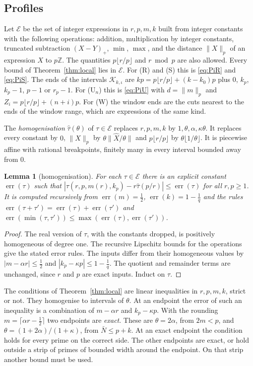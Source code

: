 \documentclass[11pt]{amsart}
\newtheorem{lemma}[theorem]{Lemma}
\theoremstyle{definition}
\theoremstyle{remark}
\numberwithin{equation}{section}
\newcommand{\Z}{\mathbb Z}
\newcommand{\err}{\operatorname{err}}
\begin{document}
\subsection{Profiles}\label{ssec:profiles}
Let $\mathcal E$ be the set of integer expressions in $r,p,m,k$ built from integer constants with the following
operations: addition, multiplication by integer constants, truncated subtraction $(X-Y)_+$, $\min$, $\max$, and the
distance $\|X\|_p$ of an expression $X$ to $p\Z$. The quantities $p\lfloor r/p\rfloor$ and $r\bmod p$ are also allowed.
Every bound of Theorem~\ref{thm:local} lies in $\mathcal E$. For (R) and (S) this is \eqref{eq:PiR} and \eqref{eq:PiS}.
The ends of the intervals $\mathcal K_{k,\iota}$ are $kp=p\lfloor r/p\rfloor+(k-k_0)p$ plus $0$, $k_p$, $k_p-1$, $p-1$ or
$r_p-1$. For (U$_n$) this is \eqref{eq:PiU} with $d=\|m\|_p$ and $Z_i=p\lfloor r/p\rfloor+(n+i)p$. For (W) the window
ends are the cuts nearest to the ends of the window range, which are expressions of the same kind.

The \emph{homogenisation} $\hat\tau(\theta)$ of $\tau\in\mathcal E$ replaces $r,p,m,k$ by $1,\theta,\alpha,\kappa\theta$.
It replaces every constant by $0$, $\|X\|_p$ by $\theta\|\hat X/\theta\|$ and $p\lfloor r/p\rfloor$ by
$\theta\lfloor1/\theta\rfloor$. It is piecewise affine with rational breakpoints, finitely many in every interval bounded
away from $0$.

\begin{lemma}[homogenisation]\label{lem:homog}
For each $\tau\in\mathcal E$ there is an explicit constant $\err(\tau)$ such that
$|\tau(r,p,m(r),k_p)-r\hat\tau(p/r)|\le\err(\tau)$ for all $r,p\ge1$. It is computed recursively from
$\err(m)=\frac12$, $\err(k)=1-\frac1q$ and the rules $\err(\tau+\tau')=\err(\tau)+\err(\tau')$ and
$\err(\min(\tau,\tau'))\le\max(\err(\tau),\err(\tau'))$.
\end{lemma}
\begin{proof}
The real version of $\tau$, with the constants dropped, is positively homogeneous of degree one.
The recursive Lipschitz bounds for the operations give the stated error rules. The inputs differ from their
homogeneous values by $|m-\alpha r|\le\frac12$ and $|k_p-\kappa p|\le1-\frac1q$.
The quotient and remainder terms are unchanged, since $r$ and $p$ are exact inputs. Induct on $\tau$.
\end{proof}

The conditions of Theorem~\ref{thm:local} are linear inequalities in $r,p,m,k$, strict or not. They homogenise to
intervals of $\theta$. At an endpoint the error of such an inequality is a combination of $m-\alpha r$ and $k_p-\kappa p$.
With the rounding $m=\lceil\alpha r-\frac12\rceil$ two endpoints are \emph{exact}. These are $\theta=2\alpha$, from
$2m<p$, and $\theta=(1+2\alpha)/(1+\kappa)$, from $\bar N\le p+k$. At an exact endpoint the condition holds for every prime on
the correct side. The other endpoints are exact, or hold outside a strip of primes of bounded width around the endpoint.
On that strip another bound must be used.
\end{document}
